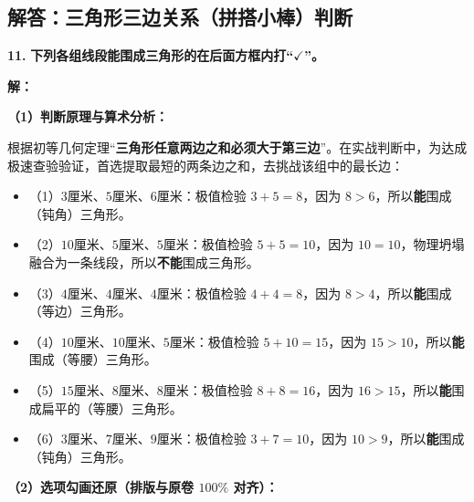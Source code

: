 \newpage

\newpage

\subsection{解答：三角形三边关系（拼搭小棒）判断}

\vspace{0.6cm}

\textbf{\LARGE 11.} \textbf{下列各组线段能围成三角形的在后面方框内打“$\checkmark$”。}

\vspace{0.4cm}
\textbf{解：}

\textbf{（1）判断原理与算术分析：}

根据初等几何定理“\textbf{三角形任意两边之和必须大于第三边}”。在实战判断中，为达成极速查验验证，首选提取最短的两条边之和，去挑战该组中的最长边：
\begin{itemize}
    \item （1）$3\text{厘米}$、$5\text{厘米}、6\text{厘米}$：极值检验 $3 + 5 = 8$，因为 $8 > 6$，所以\textbf{能}围成（钝角）三角形。
    \item （2）$10\text{厘米}$、$5\text{厘米}、5\text{厘米}$：极值检验 $5 + 5 = 10$，因为 $10 = 10$，物理坍塌融合为一条线段，所以\textbf{不能}围成三角形。
    \item （3）$4\text{厘米}$、$4\text{厘米}、4\text{厘米}$：极值检验 $4 + 4 = 8$，因为 $8 > 4$，所以\textbf{能}围成（等边）三角形。
    \item （4）$10\text{厘米}$、$10\text{厘米}、5\text{厘米}$：极值检验 $5 + 10 = 15$，因为 $15 > 10$，所以\textbf{能}围成（等腰）三角形。
    \item （5）$15\text{厘米}$、$8\text{厘米}、8\text{厘米}$：极值检验 $8 + 8 = 16$，因为 $16 > 15$，所以\textbf{能}围成扁平的（等腰）三角形。
    \item （6）$3\text{厘米}$、$7\text{厘米}、9\text{厘米}$：极值检验 $3 + 7 = 10$，因为 $10 > 9$，所以\textbf{能}围成（钝角）三角形。
\end{itemize}

\textbf{（2）选项勾画还原（排版与原卷 $100\%$ 对齐）：}

\def\emptybox{\tikz[baseline=-0.15em]{\draw[line width=0.6pt] (0,0) rectangle (0.4,0.4);}}
\def\checkedbox{\tikz[baseline=-0.15em]{
    \draw[line width=0.6pt] (0,0) rectangle (0.4,0.4);
    \draw[line width=1.2pt, red!80!black, line cap=round, line join=round] (0.05, 0.2) -- (0.15, 0.05) -- (0.5, 0.5);
}}

